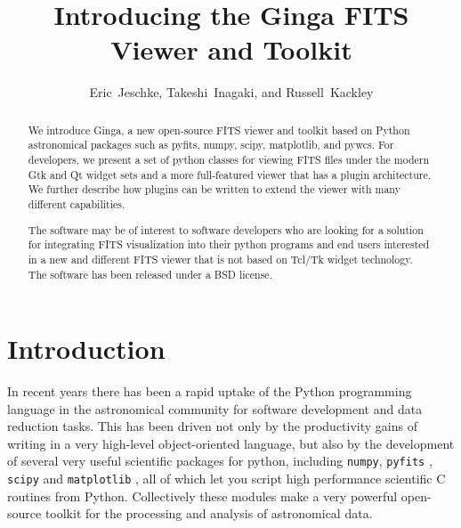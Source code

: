 
\resetcounters




\title{Introducing the Ginga FITS Viewer and Toolkit}
\author{Eric~Jeschke, Takeshi~Inagaki, and Russell~Kackley
}


\begin{abstract}
We introduce Ginga, a new open-source FITS
viewer and toolkit based on Python astronomical packages such as pyfits, numpy, scipy, matplotlib, and pywcs.  For developers, we present a set of python classes for viewing FITS files under the modern Gtk and Qt widget sets and a more  full-featured viewer that has a plugin architecture. We further describe how plugins can be written to extend the viewer with many different capabilities.  

The software may be of interest to software developers who are looking for a solution for integrating FITS visualization into their python programs and end users interested in a new and different FITS viewer that is not based on Tcl/Tk widget technology.  The software has been released under a BSD license.
\end{abstract}

\section{Introduction}
In recent years there has been a rapid uptake of the Python programming language in the astronomical community for software development and data reduction tasks. This has been driven not only by the productivity gains of writing in a very high-level object-oriented language, but also by the development of several very useful scientific packages for python, including  {\tt {}numpy}, {\tt {}pyfits} \citep{Barrett99}, {\tt {}scipy} and {\tt {}matplotlib} \citep{matplotlib}, all of which let you script high performance scientific C routines from Python. Collectively these modules make a very powerful open-source toolkit for the processing and analysis of astronomical data.

